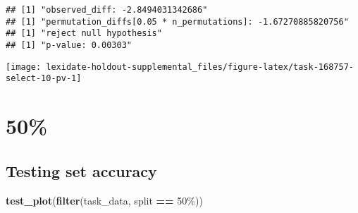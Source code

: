 \documentclass[
]{book}
\newenvironment{Shaded}{\begin{snugshade}}{\end{snugshade}}
\newcommand{\AttributeTok}[1]{\textcolor[rgb]{0.13,0.29,0.53}{#1}}
\newcommand{\DecValTok}[1]{\textcolor[rgb]{0.00,0.00,0.81}{#1}}
\newcommand{\FunctionTok}[1]{\textcolor[rgb]{0.13,0.29,0.53}{\textbf{#1}}}
\newcommand{\NormalTok}[1]{#1}
\newcommand{\OtherTok}[1]{\textcolor[rgb]{0.56,0.35,0.01}{#1}}
\newcommand{\SpecialCharTok}[1]{\textcolor[rgb]{0.81,0.36,0.00}{\textbf{#1}}}
\newcommand{\StringTok}[1]{\textcolor[rgb]{0.31,0.60,0.02}{#1}}
\begin{document}
\begin{Shaded}
\end{Shaded}

\begin{verbatim}
## [1] "observed_diff: -2.8494031342686"
## [1] "permutation_diffs[0.05 * n_permutations]: -1.67270885820756"
## [1] "reject null hypothesis"
## [1] "p-value: 0.00303"
\end{verbatim}

\texttt{[image: lexidate-holdout-supplemental\_files/figure-latex/task-168757-select-10-pv-1]}

\hypertarget{section-22}{%
\section{50\%}\label{section-22}}

\hypertarget{testing-set-accuracy-22}{%
\subsection{Testing set accuracy}\label{testing-set-accuracy-22}}

\begin{Shaded}
\begin{Highlighting}[]
\FunctionTok{test\_plot}\NormalTok{(}\FunctionTok{filter}\NormalTok{(task\_data, split }\SpecialCharTok{==} \StringTok{\textquotesingle{}50\%\textquotesingle{}}\NormalTok{))}
\end{Highlighting}
\end{Shaded}
\end{document}
